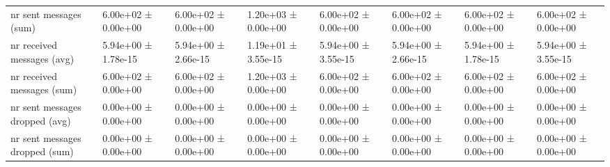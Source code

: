 \begin{tabular}{llllllll}
 nr sent messages (sum)             & 6.00e+02 ± 0.00e+00 & 6.00e+02 ± 0.00e+00 & 1.20e+03 ± 0.00e+00 & 6.00e+02 ± 0.00e+00 & 6.00e+02 ± 0.00e+00 & 6.00e+02 ± 0.00e+00 & 6.00e+02 ± 0.00e+00 \\
 nr received messages (avg)         & 5.94e+00 ± 1.78e-15 & 5.94e+00 ± 2.66e-15 & 1.19e+01 ± 3.55e-15 & 5.94e+00 ± 3.55e-15 & 5.94e+00 ± 2.66e-15 & 5.94e+00 ± 1.78e-15 & 5.94e+00 ± 3.55e-15 \\
 nr received messages (sum)         & 6.00e+02 ± 0.00e+00 & 6.00e+02 ± 0.00e+00 & 1.20e+03 ± 0.00e+00 & 6.00e+02 ± 0.00e+00 & 6.00e+02 ± 0.00e+00 & 6.00e+02 ± 0.00e+00 & 6.00e+02 ± 0.00e+00 \\
 nr sent messages dropped (avg)     & 0.00e+00 ± 0.00e+00 & 0.00e+00 ± 0.00e+00 & 0.00e+00 ± 0.00e+00 & 0.00e+00 ± 0.00e+00 & 0.00e+00 ± 0.00e+00 & 0.00e+00 ± 0.00e+00 & 0.00e+00 ± 0.00e+00 \\
 nr sent messages dropped (sum)     & 0.00e+00 ± 0.00e+00 & 0.00e+00 ± 0.00e+00 & 0.00e+00 ± 0.00e+00 & 0.00e+00 ± 0.00e+00 & 0.00e+00 ± 0.00e+00 & 0.00e+00 ± 0.00e+00 & 0.00e+00 ± 0.00e+00 \\
\hline
\end{tabular}